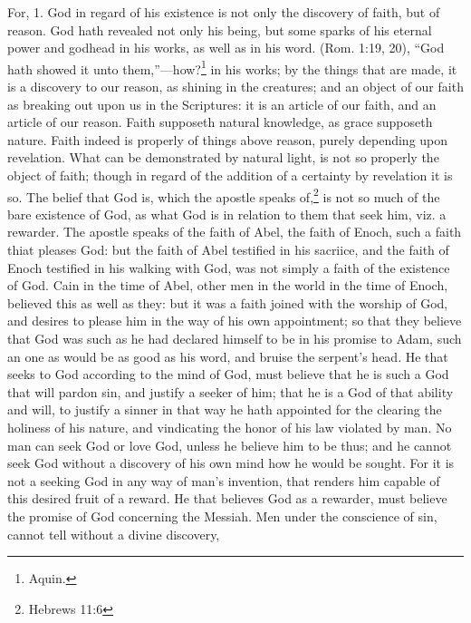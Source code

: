 \documentclass[a5paper]{book}
\begin{document}
For, 1. God in regard of his existence is not only the discovery of faith, 
    but of reason. 
God hath revealed not only his being, 
    but some sparks of his eternal power and godhead in his works, 
    as well as in his word. 
(Rom. 1:19, 20), “God hath showed it unto them,”---how?\footnote{Aquin.}
    in his works; by the things that are made, 
    it is a discovery to our reason, as shining in the creatures; 
    and an object of our faith as breaking out upon us in the Scriptures: 
    it is an article of our faith, and an article of our reason. 
Faith supposeth natural knowledge, as grace supposeth nature. 
Faith indeed is properly of things above reason, 
    purely depending upon revelation. 
What can be demonstrated by natural light, 
    is not so properly the object of faith;
    though in regard of the addition of a certainty by revelation it is so.
The belief that God is, which the apostle speaks of,\footnote{Hebrews 11:6}
    is not so much of the bare existence of God, 
    as what God is in relation to them that
    seek him, viz. a rewarder.  %
The apostle speaks of the faith of Abel,
    the faith of Enoch, 
    such a faith thiat pleases God: 
    but the faith of Abel testified in his sacriice, 
    and the faith of Enoch testified in his walking with God, 
    was not simply a faith of the existence of God.
Cain in the time of Abel, 
    other men in the world in the time of Enoch, 
    believed this as well as they: 
    but it was a faith joined with the worship of God, 
    and desires to please him in the way of his own appointment; 
    so that they believe that God was 
    such as he had declared himself to be in his promise to Adam, 
    such an one as would be as good as his word, 
    and bruise the serpent’s head. 
He that seeks to God according to the mind of God, 
    must believe that he is such a God that will pardon sin, 
    and justify a seeker of him; 
    that he is a God of that ability and will, 
    to justify a sinner in that way he hath appointed 
    for the clearing the holiness of his nature, 
    and vindicating the honor of his law violated by man. 
No man can seek God or love God, 
    unless he believe him to be thus; 
    and he cannot seek God without a discovery of his own mind 
    how he would be sought. 
For it is not a seeking God in any way of man's invention, 
    that renders him capable of this desired fruit of a reward. 
He that believes God as a rewarder, 
    must believe the promise of God concerning the Messiah. 
Men under the conscience of sin, 
    cannot tell without a divine discovery, 
\end{document}
